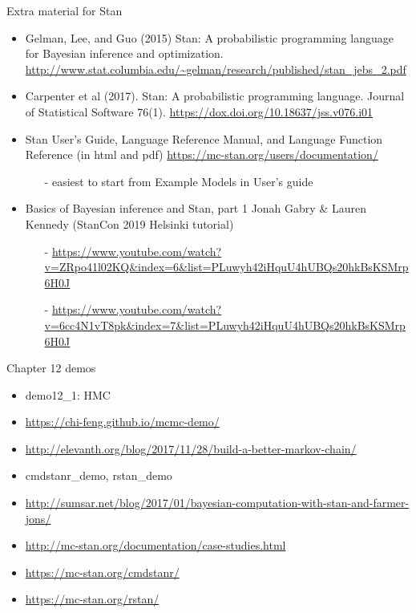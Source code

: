 \documentclass[finnish,english,t]{beamer}
\begin{document}
\begin{frame}{Extra material for Stan}

  \begin{itemize}
  \item Gelman, Lee, and Guo (2015) Stan: A
    probabilistic programming language for Bayesian inference and
    optimization. \url{http://www.stat.columbia.edu/~gelman/research/published/stan_jebs_2.pdf}
  \item Carpenter et al (2017). Stan: A probabilistic programming
    language. Journal of Statistical Software
    76(1). \url{https://dox.doi.org/10.18637/jss.v076.i01}
  \item Stan User's Guide, Language Reference Manual, and Language
    Function Reference (in html and pdf)
    \url{https://mc-stan.org/users/documentation/}
    \begin{itemize}
    \item[-] easiest to start from Example Models in User's guide
    \end{itemize}
  \item Basics of Bayesian inference and Stan, part 1 Jonah Gabry \&
    Lauren Kennedy (StanCon 2019 Helsinki tutorial)
    \begin{itemize}
    \item[-]
      \url{https://www.youtube.com/watch?v=ZRpo41l02KQ&index=6&list=PLuwyh42iHquU4hUBQs20hkBsKSMrp6H0J}
    \item[-] \url{https://www.youtube.com/watch?v=6cc4N1vT8pk&index=7&list=PLuwyh42iHquU4hUBQs20hkBsKSMrp6H0J}
  \end{itemize}
  \end{itemize}
\end{frame}


\begin{frame}{Chapter 12 demos}

  \begin{itemize}
  \item demo12\_1: HMC
  \item \url{https://chi-feng.github.io/mcmc-demo/}
  \item \url{http://elevanth.org/blog/2017/11/28/build-a-better-markov-chain/}
  \item cmdstanr\_demo, rstan\_demo
  \item \url{http://sumsar.net/blog/2017/01/bayesian-computation-with-stan-and-farmer-jons/}
  \item \url{http://mc-stan.org/documentation/case-studies.html}
  \item \url{https://mc-stan.org/cmdstanr/}
  \item \url{https://mc-stan.org/rstan/}
  \end{itemize}
  
\end{frame}
\end{document}
